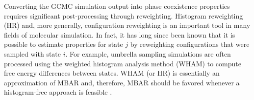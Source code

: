 \documentclass[journal=jced,manuscript=article]{achemso}
\begin{document}
%




Converting the GCMC simulation output into phase coexistence properties requires significant post-processing through reweighting. Histogram reweighting (HR) and, more generally, configuration reweighting is an important tool in many fields of molecular simulation. In fact, it has long since been known that it is possible to estimate properties for state $j$ by reweighting configurations that were sampled with state $i$. \cite{McDonald1967,Card1970,Wood1968,Pana2000} For example, umbrella sampling simulations are often processed using the weighted histogram analysis method (WHAM) to compute free energy differences between states. WHAM (or HR) is essentially an approximation of MBAR and, therefore, MBAR should be favored whenever a histogram-free approach is feasible \cite{Matos2017}. 
\end{document}

